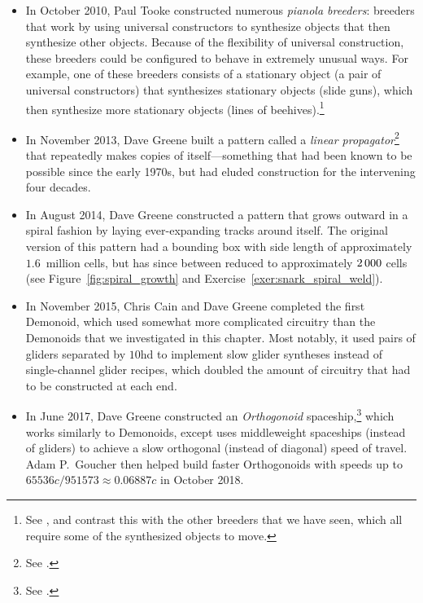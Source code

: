 \begin{itemize}
	\item In October 2010, Paul Tooke constructed numerous \emph{pianola breeders}: breeders that work by using universal constructors to synthesize objects that then synthesize other objects. Because of the flexibility of universal construction, these breeders could be configured to behave in extremely unusual ways. For example, one of these breeders consists of a stationary object (a pair of universal constructors) that synthesizes stationary objects (slide guns), which then synthesize more stationary objects (lines of beehives).\footnote{See , and contrast this with the other breeders that we have seen, which all require some of the synthesized objects to move.}\smallskip
	
	\item In November 2013, Dave Greene built a pattern called a \emph{linear propagator}\footnote{See .} that repeatedly makes copies of itself---something that had been known to be possible since the early 1970s, but had eluded construction for the intervening four decades.\smallskip
	
	\item In August 2014, Dave Greene constructed a pattern that grows outward in a spiral fashion by laying ever-expanding tracks around itself. The original version of this pattern had a bounding box with side length of approximately $1.6$~million cells, but has since between reduced to approximately $2{\,}000$ cells (see Figure~\ref{fig:spiral_growth} and Exercise~\ref{exer:snark_spiral_weld}).\smallskip
	
	\item In November 2015, Chris Cain and Dave Greene completed the first Demonoid, which used somewhat more complicated circuitry than the Demonoids that we investigated in this chapter. Most notably, it used pairs of gliders separated by $10$hd to implement slow glider syntheses instead of single-channel glider recipes, which doubled the amount of circuitry that had to be constructed at each end.\smallskip
	
	\item In June 2017, Dave Greene constructed an \emph{Orthogonoid} spaceship,\footnote{See .} which works similarly to Demonoids, except uses middleweight spaceships (instead of gliders) to achieve a slow orthogonal (instead of diagonal) speed of travel. Adam P.~Goucher then helped build faster Orthogonoids with speeds up to $65536c/951573 \approx 0.06887c$ in October 2018.\smallskip
	

\end{itemize}
